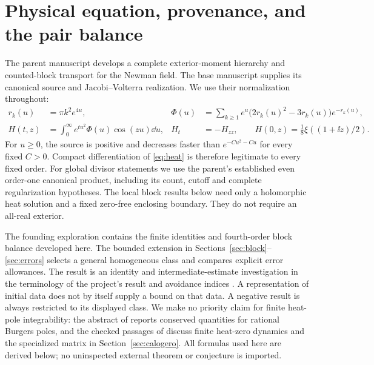 \section{Physical equation, provenance, and the pair balance}
\label{sec:context}

The parent manuscript \cite{BakerExterior2026} develops a complete
exterior-moment hierarchy and counted-block transport for the Newman
field. The base manuscript \cite{BakerVolterra2026} supplies its canonical
source and Jacobi--Volterra realization. We use their normalization
throughout:
\begin{align}
 r_k(u)&=\pi k^2e^{4u},&
 \Phi(u)&=\sum_{k\ge1} e^u\bigl(2r_k(u)^2-3r_k(u)\bigr)e^{-r_k(u)},
 \label{eq:source}\\
 H(t,z)&=\int_0^\infty e^{tu^2}\Phi(u)\cos(zu)\dd u,&
 H_t&=-H_{zz},\qquad H(0,z)=\tfrac18\xi((1+\ii z)/2).
 \label{eq:heat}
\end{align}
For $u\ge0$, the source is positive and decreases faster than
$e^{-Cu^2-Cu}$ for every fixed $C>0$. Compact differentiation of
\eqref{eq:heat} is therefore legitimate to every fixed order. For global
divisor statements we use the parent's established even order-one
canonical product, including its count, cutoff and complete
regularization hypotheses. The local block results below need only a
holomorphic heat solution and a fixed zero-free enclosing boundary.
They do not require an all-real exterior.

The founding exploration \cite{BakerConservationBrainstorm2026} contains
the finite identities and fourth-order block balance developed here.
The bounded extension in Sections~\ref{sec:block}--\ref{sec:errors}
selects a general homogeneous class and compares explicit error
allowances. The result is an identity and intermediate-estimate
investigation in the terminology of the project's result and avoidance
indices \cite{ProjectResults2026,ProjectAvoid2026}. A representation of
initial data does not by itself supply a bound on that data. A negative
result is always restricted to its displayed class. We make no priority
claim for finite heat-pole integrability: the abstract of
\cite{DeconinckKimuraSegur2007} reports conserved quantities for rational
Burgers poles, and the checked passages of \cite{Sokal2023HeatZeros}
discuss finite heat-zero dynamics and the specialized matrix in
Section~\ref{sec:calogero}. All formulas used here are derived below;
no uninspected external theorem or conjecture is imported.

